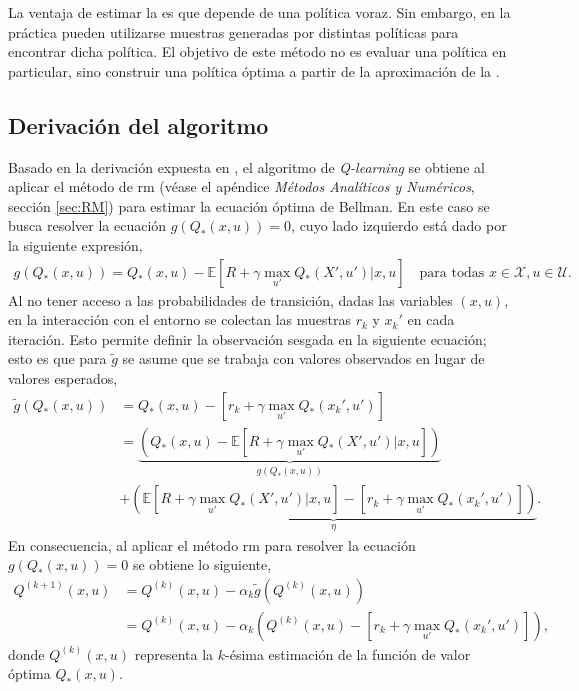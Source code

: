 La ventaja de estimar la  es que depende de una política voraz. Sin embargo, en la práctica pueden utilizarse muestras generadas por distintas políticas para encontrar dicha política. El objetivo de este método no es evaluar una política en particular, sino construir una política óptima a partir de la aproximación de la .

\subsection{Derivación del algoritmo}
Basado en la derivación expuesta en \cite{Shiyu2022}, el algoritmo de \textit{Q-learning} se obtiene al aplicar el método de \acrfull{rm} (véase el apéndice \textit{Métodos Analíticos y Numéricos}, sección \ref{sec:RM}) para estimar la ecuación óptima de Bellman. En este caso se busca resolver la ecuación $g(Q_{*}(x, u))=0$, cuyo lado izquierdo está dado por la siguiente expresión, 
\begin{align} \label{eq:g_Q}
    g(Q_{*}(x, u)) = Q_{*}(x, u) - \mathbb{E}[R + \gamma \max_{u'}Q_{*}(X', u')|x, u] \quad \text{para todas } x\in\mathcal{X}, u\in\mathcal{U}.
\end{align}
Al no tener acceso a las probabilidades de transición, dadas las variables $(x,u)$, en la interacción con el entorno se colectan las muestras $r_{k}$ y $x_{k}'$ en cada iteración. Esto permite definir la observación sesgada en la siguiente ecuación; esto es que para $\tilde{g}$ se asume que se trabaja con valores observados en lugar de valores esperados,
\begin{equation}
\begin{aligned}
    \tilde{g}(Q_{*}(x, u)) &= Q_{*}(x, u) - [r_k + \gamma\max_{u'}Q_{*}(x_k', u')] \\
    &= \underbrace{\left(
    Q_{*}(x, u) - \mathbb{E}[R +\gamma\max_{u'}Q_{*}(X',u')|x, u] 
    \right)}_{g(Q_{*}(x, u))} \\
    &+ 
    \underbrace{
    \left(
    \mathbb{E}[R+\gamma\max_{u'} Q_{*}(X', u')|x, u] 
    - [r_k+ \gamma\max_{u'} Q_{*}(x_k', u')]
    \right)}_{\eta}.
\end{aligned}
\end{equation}
En consecuencia, al aplicar el método \acrshort{rm} para resolver la ecuación $g(Q_{*}(x,u))=0$ se obtiene lo siguiente,
\begin{equation}
\begin{aligned}
    Q^{(k+1)}(x, u) &= Q^{(k)}(x, u) -\alpha_k \tilde{g}\left(Q^{(k)}(x,u)\right)
    \\
    &= Q^{(k)}(x, u) - \alpha_k \left(Q^{(k)}(x, u)- \left[r_k + \gamma \max_{u'}Q_{*}(x_k', u')\right] \right), \label{eq:RM_Q}
\end{aligned}
\end{equation}
donde $Q^{(k)}(x, u)$ representa la $k$-ésima estimación de la función de valor óptima $Q_{*}(x, u)$.

